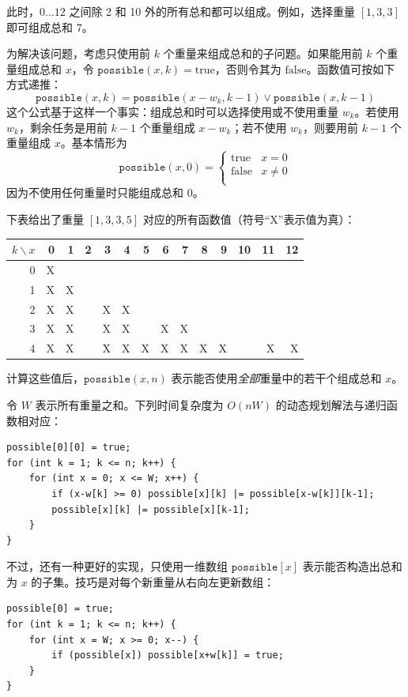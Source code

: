 此时，$0\ldots 12$ 之间除 2 和 10 外的所有总和都可以组成。例如，选择重量 $[1,3,3]$ 即可组成总和 7。

为解决该问题，考虑只使用前 $k$ 个重量来组成总和的子问题。如果能用前 $k$ 个重量组成总和 $x$，令 $\texttt{possible}(x,k)=\textrm{true}$，否则令其为 $\textrm{false}$。函数值可按如下方式递推：
\[ \texttt{possible}(x,k) = \texttt{possible}(x-w_k,k-1) \lor \texttt{possible}(x,k-1) \]
这个公式基于这样一个事实：组成总和时可以选择使用或不使用重量 $w_k$。若使用 $w_k$，剩余任务是用前 $k-1$ 个重量组成 $x-w_k$；若不使用 $w_k$，则要用前 $k-1$ 个重量组成 $x$。基本情形为
\begin{equation*}
    \texttt{possible}(x,0) = \begin{cases}
               \textrm{true}    & x = 0\\
               \textrm{false}   & x \neq 0 \\
           \end{cases}
\end{equation*}
因为不使用任何重量时只能组成总和 0。

下表给出了重量 $[1,3,3,5]$ 对应的所有函数值（符号“X”表示值为真）：

\begin{center}
\begin{tabular}{r|rrrrrrrrrrrrr}
$k \backslash x$ & 0 & 1 & 2 & 3 & 4 & 5 & 6 & 7 & 8 & 9 & 10 & 11 & 12 \\
\hline
 0 & X & \\
 1 & X & X \\
 2 & X & X & & X & X \\
 3 & X & X & & X & X & & X & X \\
 4 & X & X & & X & X & X & X & X & X & X & & X & X \\
\end{tabular}
\end{center}

计算这些值后，$\texttt{possible}(x,n)$ 表示能否使用\emph{全部}重量中的若干个组成总和 $x$。

令 $W$ 表示所有重量之和。下列时间复杂度为 $O(nW)$ 的动态规划解法与递归函数相对应：
\begin{lstlisting}
possible[0][0] = true;
for (int k = 1; k <= n; k++) {
    for (int x = 0; x <= W; x++) {
        if (x-w[k] >= 0) possible[x][k] |= possible[x-w[k]][k-1];
        possible[x][k] |= possible[x][k-1];
    }
}
\end{lstlisting}

不过，还有一种更好的实现，只使用一维数组 $\texttt{possible}[x]$ 表示能否构造出总和为 $x$ 的子集。技巧是对每个新重量从右向左更新数组：
\begin{lstlisting}
possible[0] = true;
for (int k = 1; k <= n; k++) {
    for (int x = W; x >= 0; x--) {
        if (possible[x]) possible[x+w[k]] = true;
    }
}
\end{lstlisting}

